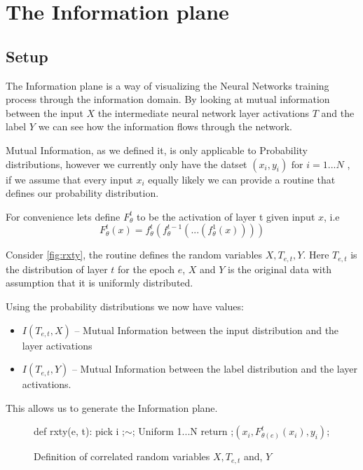 \documentclass[dissertation.tex]{subfiles}
\begin{document}
\section{The Information plane}
\label{sec:IP}

\subsection{Setup}

The Information plane is a way of visualizing the Neural Networks training
process through the information domain. By looking at mutual information between
the input $X$ the intermediate neural network layer activations $T$ and the
label $Y$ we can see how the information flows through the network.

Mutual Information, as we defined it, is only applicable to Probability
distributions, however we currently only have the datset 
$(x_i, y_i) \text{ for } i = 1...N$
, if we assume that every input $x_i$ equally likely we can provide a routine
that defines our probability distribution.

For convenience lets define $F_{\theta}^t$ to be the activation of layer t given
input $x$, i.e
\begin{equation}
  F_{\theta}^t(x) = f_{\theta}^t(f_{\theta}^{t-1}(...(f_{\theta}^1(x))))
  \label{eq:bigF}
\end{equation}


Consider \autoref{fig:rxty}, the routine defines the random variables
$X,T_{e,t},Y$. Here $T_{e,t}$ is the distribution of layer $t$ for the epoch $e$,
$X$ and $Y$ is the original data with assumption that it is uniformly
distributed. 

Using the probability distributions we now have values:
\begin{itemize}
  \item{
      $I(T_{e,t}, X)$ -- Mutual Information between the input distribution and the
      layer activations 
    }
  \item{
      $I(T_{e,t}, Y)$ -- Mutual Information between the label distribution and the
      layer activations.
    }
\end{itemize}
This allows us to generate the Information plane.


\begin{figure}[H]
    \begin{pythonfigure}
      def rxty(e, t):
        pick i ;$\sim$; Uniform {1...N}
        return ;$(x_i, F_{\theta(e)}^t(x_i), y_i)$;
    \end{pythonfigure}
    \caption{Definition of correlated random variables $X, T_{e,t}$ and, $Y$}
    \label{fig:rxty}
\end{figure}
\end{document}
